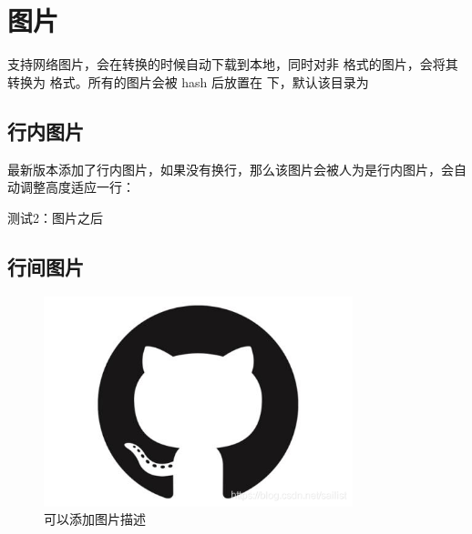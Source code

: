 \documentclass{article}%
\begin{document}
%
%
%

%
\section{图片}%

%
支持网络图片，会在转换的时候自动下载到本地，同时对非  格式的图片，会将其转换为  格式。所有的图片会被 hash 后放置在  下，默认该目录为 %

%
\subsection{行内图片}%

%

%
最新版本添加了行内图片，如果没有换行，那么该图片会被人为是行内图片，会自动调整高度适应一行：%

%
测试2：图片之后%

%
\subsection{行间图片}%

%

%
\begin{center}%


\begin{figure}[H]%
%
\includegraphics[width=0.8\textwidth]{imgs/1c59f8ef2aa3c5e527a22b7c258489d6.png}%
\caption{可以添加图片描述}%
\end{figure}

%
\end{center}%
\end{document}

